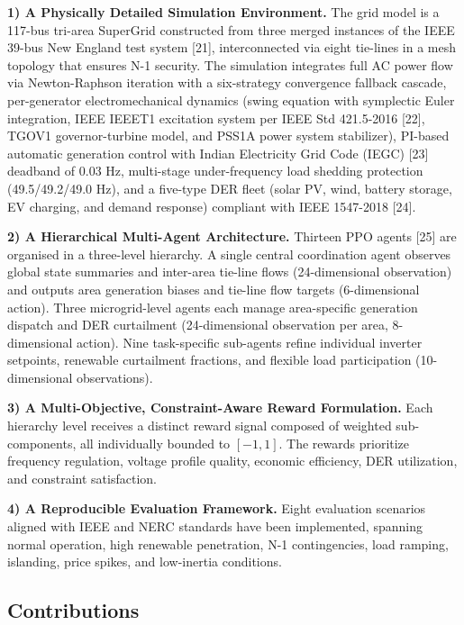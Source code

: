 \documentclass[conference]{IEEEtran}
\begin{document}
\textbf{1) A Physically Detailed Simulation Environment.} The grid model is a 117-bus tri-area SuperGrid constructed from three merged instances of the IEEE 39-bus New England test system [21], interconnected via eight tie-lines in a mesh topology that ensures N-1 security. The simulation integrates full AC power flow via Newton-Raphson iteration with a six-strategy convergence fallback cascade, per-generator electromechanical dynamics (swing equation with symplectic Euler integration, IEEE IEEET1 excitation system per IEEE Std 421.5-2016 [22], TGOV1 governor-turbine model, and PSS1A power system stabilizer), PI-based automatic generation control with Indian Electricity Grid Code (IEGC) [23] deadband of 0.03 Hz, multi-stage under-frequency load shedding protection (49.5/49.2/49.0 Hz), and a five-type DER fleet (solar PV, wind, battery storage, EV charging, and demand response) compliant with IEEE 1547-2018 [24].

\textbf{2) A Hierarchical Multi-Agent Architecture.} Thirteen PPO agents [25] are organised in a three-level hierarchy. A single central coordination agent observes global state summaries and inter-area tie-line flows (24-dimensional observation) and outputs area generation biases and tie-line flow targets (6-dimensional action). Three microgrid-level agents each manage area-specific generation dispatch and DER curtailment (24-dimensional observation per area, 8-dimensional action). Nine task-specific sub-agents refine individual inverter setpoints, renewable curtailment fractions, and flexible load participation (10-dimensional observations).

\textbf{3) A Multi-Objective, Constraint-Aware Reward Formulation.} Each hierarchy level receives a distinct reward signal composed of weighted sub-components, all individually bounded to $[-1, 1]$. The rewards prioritize frequency regulation, voltage profile quality, economic efficiency, DER utilization, and constraint satisfaction.

\textbf{4) A Reproducible Evaluation Framework.} Eight evaluation scenarios aligned with IEEE and NERC standards have been implemented, spanning normal operation, high renewable penetration, N-1 contingencies, load ramping, islanding, price spikes, and low-inertia conditions.

\subsection{Contributions}
\end{document}
